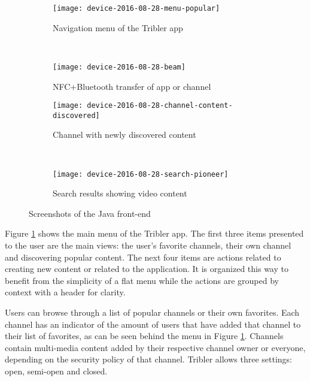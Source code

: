 \begin{figure}[p]
	\centering
	\begin{subfigure}{.4\textwidth}
		\texttt{[image: device-2016-08-28-menu-popular]}
		\caption{Navigation menu of the Tribler app}
		\label{fig:menu-popular}
	\end{subfigure}
	~
	\begin{subfigure}{.4\textwidth}
		\texttt{[image: device-2016-08-28-beam]}
		\caption{NFC+Bluetooth transfer of app or channel}
		\label{fig:beam}
	\end{subfigure}
	
	\begin{subfigure}{.4\textwidth}
		\texttt{[image: device-2016-08-28-channel-content-discovered]}
		\caption{Channel with newly discovered content}
		\label{fig:channel-content-discovered}
	\end{subfigure}
	~
	\begin{subfigure}{.4\textwidth}
		\texttt{[image: device-2016-08-28-search-pioneer]}
		\caption{Search results showing video content}
		\label{fig:search-pioneer}
	\end{subfigure}
\caption{Screenshots of the Java front-end}
\end{figure}


Figure \ref{fig:menu-popular} shows the main menu of the Tribler app.
The first three items presented to the user are the main views: the user's favorite channels, their own channel and discovering popular content.
The next four items are actions related to creating new content or related to the application.
It is organized this way to benefit from the simplicity of a flat menu while the actions are grouped by context with a header for clarity.

Users can browse through a list of popular channels or their own favorites.
Each channel has an indicator of the amount of users that have added that channel to their list of favorites, as can be seen behind the menu in Figure \ref{fig:menu-popular}.
Channels contain multi-media content added by their respective channel owner or everyone, depending on the security policy of that channel.
Tribler allows three settings: open, semi-open and closed.


